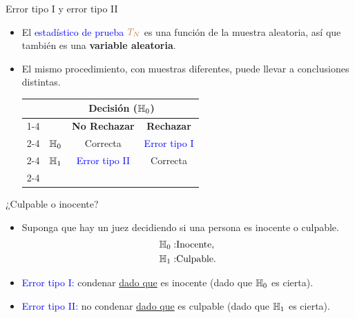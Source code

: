 \documentclass[10pt, xcolor=dvipsnames]{beamer}
\begin{document}
\begin{frame}{Error tipo I y error tipo II}
\begin{itemize}
	\item El \textcolor{blue}{estadístico de prueba} $\textcolor{brown}{T_N}$ es una función de la muestra aleatoria, así que también es una \textbf{variable aleatoria}.
	\item El mismo procedimiento, con muestras diferentes, puede llevar a conclusiones distintas. \\ \vspace{2em}
\begin{center}
	\begin{tabular}{ l | c | c | c |}
		& \multicolumn{3}{c}{\textbf{Decisión} ($\textcolor{black}{\mathbb{H}_{0}}$)} \\ \cline{1-4}
		\multirow{3}{*}{\textbf{Realidad}}  & & \textbf{No Rechazar} & \textbf{Rechazar} \\ \cline{2-4}
		& $\textcolor{black}{\mathbb{H}_{0}}$ & Correcta & \textcolor{blue}{Error tipo I}  \\ \cline{2-4}
		& $\textcolor{black}{\mathbb{H}_{1}}$ & \textcolor{blue}{Error tipo II} & Correcta \\ \cline{2-4}
	\end{tabular}
\end{center}		 
\end{itemize}
\end{frame}


\begin{frame}{¿Culpable o inocente?}
\begin{itemize}
    \item Suponga que hay un juez decidiendo si una persona es inocente o culpable. \vspace{-0.3cm}
    \begin{align*}
    \begin{split}
        \textcolor{black}{\mathbb{H}_{0}}:& \text{Inocente}, \\
        \textcolor{black}{\mathbb{H}_{1}}:& \text{Culpable}.
    \end{split}
    \end{align*}
    \item \textcolor{blue}{Error tipo I:} condenar \underline{dado que} es inocente (dado que $\textcolor{black}{\mathbb{H}_{0}}$ es cierta).
    \item \textcolor{blue}{Error tipo II:} no condenar \underline{dado que} es culpable (dado que $\textcolor{black}{\mathbb{H}_{1}}$ es cierta).
\end{itemize}
\end{frame}
\end{document}
